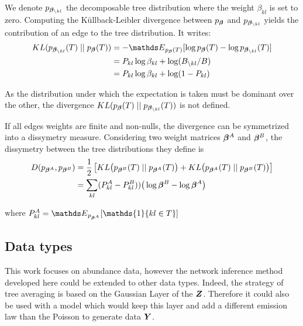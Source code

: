 We denote $p_{{\boldsymbol{\beta}}_{\setminus kl}}$ the  decomposable tree distribution where the weight $\beta_{kl}$ is set to zero. Computing the Küllback-Leibler divergence between $p_{\boldsymbol{\beta}}$ and $p_{{\boldsymbol{\beta}}_{\setminus kl}}$ yields  the contribution of an edge to  the tree distribution. It writes:
\begin{align*}
KL(p_{\betabf_{\setminus kl}} (T) \mid\mid p_\betabf (T)) &= -\Esp_{p_\betabf (T)} [\log p_\betabf (T) - \log p_{\betabf_{\setminus kl}} (T)]\\
&=P_{kl} \log \beta_{kl} + \log ( B_{\setminus kl}/B)\\
&=P_{kl} \log \beta_{kl} + \log (1-P_{kl})
\end{align*}

As the distribution under which the expectation is taken must be dominant over the other, the divergence $KL(p_{\boldsymbol{\beta}} (T)\mid\mid p_{{\boldsymbol{\beta}}_{\setminus kl}} (T)) $ is not defined.

If all edges weights are finite and non-nulls, the divergence can be symmetrized into a dissymetry measure. Considering two weight matrices ${\boldsymbol{\beta}}^A$ and ${\boldsymbol{\beta}}^B$, the dissymetry between the tree distributions they define is
\begin{align*}
D(p_{{\boldsymbol{\beta}}^A}, p_{{\boldsymbol{\beta}}^B}) &=\frac{1}{2} \left[KL\big( p_{{\boldsymbol{\beta}}^B} (T) \mid\mid p_{{\boldsymbol{\beta}}^A}(T)\big)+KL\big( p_{{\boldsymbol{\beta}}^A}(T)\mid\mid p_{{\boldsymbol{\beta}}^B} (T)  \big)\right]\\
&=\sum_{kl} ( P_{kl}^A - P_{kl}^B) ) \big(\log {\boldsymbol{\beta}}^B - \log {\boldsymbol{\beta}}^A\big)
\end{align*}

where $P_{kl}^A = \Esp_{p_{\betabf^A}}[\mathds{1}\{kl\in T\}]$



\subsection{Data types}
This work focuses on abundance data, however the network inference method developed here could be extended to other data types. Indeed, the strategy of tree averaging is based on the Gaussian Layer of the ${\boldsymbol{Z}}$. Therefore it could also be used with a model which would keep this layer and add a different emission law than the Poisson to generate data ${\boldsymbol{Y}}$.

